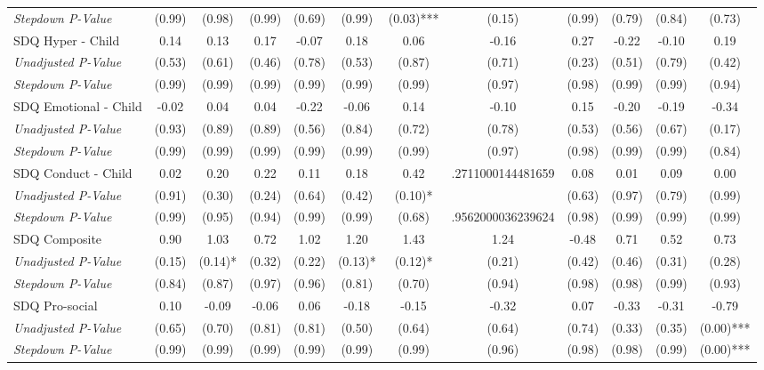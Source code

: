 \begin{tabular}{l c c c c c c c c c c c}
\quad \textit{Stepdown P-Value} & (0.99) & (0.98) & (0.99) & (0.69) & (0.99) & (0.03)*** & (0.15) & (0.99) & (0.79) & (0.84) & (0.73) \\
SDQ Hyper - Child & 0.14 & 0.13 & 0.17 & -0.07 & 0.18 & 0.06 & -0.16 & 0.27 & -0.22 & -0.10 & 0.19 \\
\quad \textit{Unadjusted P-Value} & (0.53) & (0.61) & (0.46) & (0.78) & (0.53) & (0.87) & (0.71) & (0.23) & (0.51) & (0.79) & (0.42) \\
\quad \textit{Stepdown P-Value} & (0.99) & (0.99) & (0.99) & (0.99) & (0.99) & (0.99) & (0.97) & (0.98) & (0.99) & (0.99) & (0.94) \\
SDQ Emotional - Child & -0.02 & 0.04 & 0.04 & -0.22 & -0.06 & 0.14 & -0.10 & 0.15 & -0.20 & -0.19 & -0.34 \\
\quad \textit{Unadjusted P-Value} & (0.93) & (0.89) & (0.89) & (0.56) & (0.84) & (0.72) & (0.78) & (0.53) & (0.56) & (0.67) & (0.17) \\
\quad \textit{Stepdown P-Value} & (0.99) & (0.99) & (0.99) & (0.99) & (0.99) & (0.99) & (0.97) & (0.98) & (0.99) & (0.99) & (0.84) \\
SDQ Conduct - Child & 0.02 & 0.20 & 0.22 & 0.11 & 0.18 & 0.42 & .2711000144481659 & 0.08 & 0.01 & 0.09 & 0.00 \\
\quad \textit{Unadjusted P-Value} & (0.91) & (0.30) & (0.24) & (0.64) & (0.42) & (0.10)* & & (0.63) & (0.97) & (0.79) & (0.99) \\
\quad \textit{Stepdown P-Value} & (0.99) & (0.95) & (0.94) & (0.99) & (0.99) & (0.68) & .9562000036239624 & (0.98) & (0.99) & (0.99) & (0.99) \\
SDQ Composite & 0.90 & 1.03 & 0.72 & 1.02 & 1.20 & 1.43 & 1.24 & -0.48 & 0.71 & 0.52 & 0.73 \\
\quad \textit{Unadjusted P-Value} & (0.15) & (0.14)* & (0.32) & (0.22) & (0.13)* & (0.12)* & (0.21) & (0.42) & (0.46) & (0.31) & (0.28) \\
\quad \textit{Stepdown P-Value} & (0.84) & (0.87) & (0.97) & (0.96) & (0.81) & (0.70) & (0.94) & (0.98) & (0.98) & (0.99) & (0.93) \\
SDQ Pro-social & 0.10 & -0.09 & -0.06 & 0.06 & -0.18 & -0.15 & -0.32 & 0.07 & -0.33 & -0.31 & -0.79 \\
\quad \textit{Unadjusted P-Value} & (0.65) & (0.70) & (0.81) & (0.81) & (0.50) & (0.64) & (0.64) & (0.74) & (0.33) & (0.35) & (0.00)*** \\
\quad \textit{Stepdown P-Value} & (0.99) & (0.99) & (0.99) & (0.99) & (0.99) & (0.99) & (0.96) & (0.98) & (0.98) & (0.99) & (0.00)*** \\

\end{tabular}
